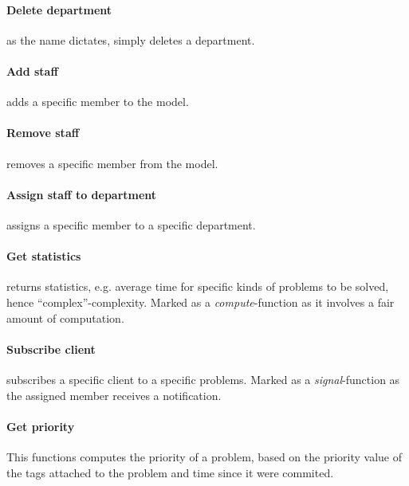 \paragraph{Delete department} as the name dictates, simply deletes a department. 

\paragraph{Add staff} adds a specific \astaff[] member to the model. 

\paragraph{Remove staff} removes a specific \astaff[] member from the model. 

\paragraph{Assign staff to department} assigns a specific \astaff[] member to a specific department. 

\paragraph{Get statistics} returns statistics, e.g. average time for specific kinds of problems to be solved, hence ``complex''-complexity. Marked as a \textit{compute}-function as it involves a fair amount of computation.
\paragraph{Subscribe client} subscribes a specific client to a specific problems. Marked as a \textit{signal}-function as the assigned \astaff[] member receives a notification. 

\paragraph{Get priority} This functions computes the priority of a problem, based on the priority value of the tags attached to the problem and time since it were commited.